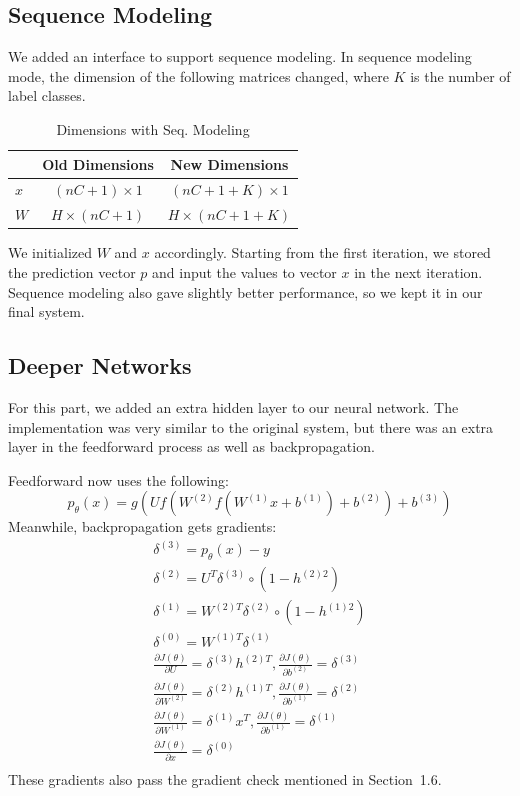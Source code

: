 \documentclass[12pt, twocolumn]{article}
\begin{document}
\subsection{Sequence Modeling}
We added an interface to support sequence modeling. In sequence modeling mode, the dimension of the following matrices changed, where $K$ is the number of label classes.
\begin{table}[H]
\centering
	\begin{tabular}{|l|c|c|}
		\hline
		 & Old Dimensions & New Dimensions \\\hline
		$x$ & ${(nC+1)}\times{1}$ & ${(nC+1+K)}\times{1}$ \\\hline
		$W$ & ${H}\times{(nC+1)}$ & ${H}\times{(nC+1+K)}$ \\\hline
	\end{tabular}
\caption{Dimensions with Seq. Modeling}
\label{tab:dim2}
\end{table}
We initialized $W$ and $x$ accordingly. Starting from the first iteration, we stored the prediction vector $p$ and input the values to vector $x$ in the next iteration. Sequence modeling also gave slightly better performance, so we kept it in our final system.
\subsection{Deeper Networks}
For this part, we added an extra hidden layer to our neural network. The implementation was very similar to the original system, but there was an extra layer in the feedforward process as well as backpropagation.

Feedforward now uses the following:
\begin{equation*}
p_\theta(x)=g(Uf(W^{(2)}f(W^{(1)}x + b^{(1)})+b^{(2)})+b^{(3)})
\end{equation*}
Meanwhile, backpropagation gets gradients:
\begin{gather*}
\delta^{(3)} = p_\theta(x) - y\\
\delta^{(2)} = U^T\delta^{(3)}\circ(1-h^{(2)2})\\
\delta^{(1)} = W^{(2)T}\delta^{(2)}\circ(1-h^{(1)2})\\
\delta^{(0)} = W^{(1)T}\delta^{(1)}\\
\frac{\partial J(\theta)}{\partial U} = \delta^{(3)}h^{(2)T}, \frac{\partial J(\theta)}{\partial b^{(2)}} = \delta^{(3)}\\
\frac{\partial J(\theta)}{\partial W^{(2)}} = \delta^{(2)}h^{(1)T}, \frac{\partial J(\theta)}{\partial b^{(1)}} = \delta^{(2)}\\
\frac{\partial J(\theta)}{\partial W^{(1)}} = \delta^{(1)}x^T, \frac{\partial J(\theta)}{\partial b^{(1)}} = \delta^{(1)}\\
\frac{\partial J(\theta)}{\partial x} = \delta^{(0)}\\
\end{gather*}
These gradients also pass the gradient check mentioned in Section~1.6.
\end{document}
